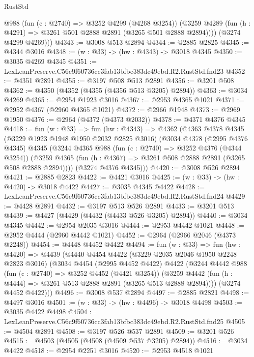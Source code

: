 \begin{lexlean}{RustStd}
\begin{coremodule}
          @988
          (fun (c : @2740) => @3252 @4299 (@4268 @3254))
          (@3259 @4289 (fun (h : @4291) => @3261 @501 @2888 @2891 (@3265 @501 @2888 @2894))))
        (@3274 @4299 @4269)))
@4343 := @3008 @513 @2894
@4344 := @2885 @2825
@4345 := @4344 @3016
@4348 := (w : @33) -> (hw : @4343) -> @3018 @4345
@4350 := @3035 @4269 @4345
@4351 := LexLeanPreserve.C56c9f60736cc3fab13bfbc383dc49ebd.R2.RustStd.fnd23
@4352 := @4351 @2891
@4355 := @3197 @508 @513 @2891
@4356 := @3201 @508
@4362 := @4350 (@4352 (@4355 (@4356 @513 @3205) @2894))
@4363 := @3034 @4269
@4365 := @2954 @1923 @3016
@4367 := @2953 @4365 @1021
@4371 := @2952 @4367 (@2960 @4365 @1021)
@4372 := @2966 @1948
@4373 := @2969 @1950
@4376 := @2964 (@4372 (@4373 @2032))
@4378 := @4371 @4376 @4345
@4418 := fun (w : @33) =>
  fun (hw : @4343) =>
  @4362
    (@4363
      @4378
      @4345
      (@3229 @1923 @1948 @1950 @2032 @2825 @3016)
      (@3034
        @4378
        (@2995 @4376 @4345)
        @4345
        (@3244
          @4365
          @988
          (fun (c : @2740) => @3252 @4376 (@4344 @3254))
          (@3259 @4365 (fun (h : @4367) => @3261 @508 @2888 @2891 (@3265 @508 @2888 @2894))))
        (@3274 @4376 @4345)))
@4420 := @3008 @526 @2894
@4421 := @2885 @2823
@4422 := @4421 @3016
@4425 := (w : @33) -> (hw : @4420) -> @3018 @4422
@4427 := @3035 @4345 @4422
@4428 := LexLeanPreserve.C56c9f60736cc3fab13bfbc383dc49ebd.R2.RustStd.fnd24
@4429 := @4428 @2891
@4432 := @3197 @513 @526 @2891
@4433 := @3201 @513
@4439 := @4427 (@4429 (@4432 (@4433 @526 @3205) @2894))
@4440 := @3034 @4345
@4442 := @2954 @2035 @3016
@4444 := @2953 @4442 @1021
@4448 := @2952 @4444 (@2960 @4442 @1021)
@4452 := @2964 (@2966 @2046 (@4373 @2248))
@4454 := @4448 @4452 @4422
@4494 := fun (w : @33) =>
  fun (hw : @4420) =>
  @4439
    (@4440
      @4454
      @4422
      (@3229 @2035 @2046 @1950 @2248 @2823 @3016)
      (@3034
        @4454
        (@2995 @4452 @4422)
        @4422
        (@3244
          @4442
          @988
          (fun (c : @2740) => @3252 @4452 (@4421 @3254))
          (@3259 @4442 (fun (h : @4444) => @3261 @513 @2888 @2891 (@3265 @513 @2888 @2894))))
        (@3274 @4452 @4422)))
@4496 := @3008 @537 @2894
@4497 := @2885 @2821
@4498 := @4497 @3016
@4501 := (w : @33) -> (hw : @4496) -> @3018 @4498
@4503 := @3035 @4422 @4498
@4504 := LexLeanPreserve.C56c9f60736cc3fab13bfbc383dc49ebd.R2.RustStd.fnd25
@4505 := @4504 @2891
@4508 := @3197 @526 @537 @2891
@4509 := @3201 @526
@4515 := @4503 (@4505 (@4508 (@4509 @537 @3205) @2894))
@4516 := @3034 @4422
@4518 := @2954 @2251 @3016
@4520 := @2953 @4518 @1021

\end{coremodule}
\end{lexlean}
